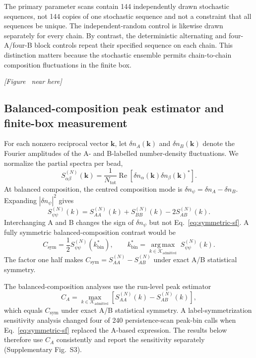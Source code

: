 \documentclass[pdflatex,sn-nature,onecolumn]{sn-jnl}
\newcommand{\figurecallout}[1]{%
  \refstepcounter{figure}\label{#1}%
  \begin{center}\textit{[Figure \thefigure\ near here]}\end{center}}
\begin{document}
The primary parameter scans contain 144 independently drawn stochastic sequences, not 144 copies of one stochastic sequence and not a constraint that all sequences be unique. The independent-random control is likewise drawn separately for every chain. By contrast, the deterministic alternating and four-A/four-B block controls repeat their specified sequence on each chain. This distinction matters because the stochastic ensemble permits chain-to-chain composition fluctuations in the finite box.

\figurecallout{fig:sequence_construction}

\subsection{Balanced-composition peak estimator and finite-box measurement}

For each nonzero reciprocal vector $\bm{k}$, let $\delta n_A(\bm{k})$ and $\delta n_B(\bm{k})$ denote the Fourier amplitudes of the A- and B-labelled number-density fluctuations. We normalize the partial spectra per bead,
\begin{equation}
S_{\alpha\beta}^{(N)}(\bm{k})=\frac{1}{N_{\mathrm{tot}}}
\operatorname{Re}\!\left[\delta n_\alpha(\bm{k})\delta n_\beta(\bm{k})^*\right].
\label{eq:partial-sf}
\end{equation}
At balanced composition, the centred composition mode is $\delta n_\psi=\delta n_A-\delta n_B$. Expanding $|\delta n_\psi|^2$ gives
\begin{equation}
S_{\psi\psi}^{(N)}(k)=S_{AA}^{(N)}(k)+S_{BB}^{(N)}(k)-2S_{AB}^{(N)}(k).
\label{eq:symmetric-sf}
\end{equation}
Interchanging A and B changes the sign of $\delta n_\psi$ but not Eq.~\ref{eq:symmetric-sf}. A fully symmetric balanced-composition contrast would be
\begin{equation}
C_{\mathrm{sym}}=\frac{1}{2}S_{\psi\psi}^{(N)}(k_{\mathrm{bin}}^*),\qquad
k_{\mathrm{bin}}^*=\underset{k\in\mathcal{K}_{\mathrm{admitted}}}{\operatorname{arg\,max}}\;S_{\psi\psi}^{(N)}(k).
\label{eq:contrast}
\end{equation}
The factor one half makes $C_{\mathrm{sym}}=S_{AA}^{(N)}-S_{AB}^{(N)}$ under exact A/B statistical symmetry.

The balanced-composition analyses use the run-level peak estimator
\begin{equation}
C_A=\max_{k\in\mathcal K_{\mathrm{admitted}}}
\left[S_{AA}^{(N)}(k)-S_{AB}^{(N)}(k)\right],
\label{eq:peak-estimator}
\end{equation}
which equals $C_{\mathrm{sym}}$ under exact A/B statistical symmetry. A label-symmetrization sensitivity analysis changed four of 240 persistence-scan peak-bin calls when Eq.~\ref{eq:symmetric-sf} replaced the A-based expression. The results below therefore use $C_A$ consistently and report the sensitivity separately (Supplementary Fig.~S3).
\end{document}
